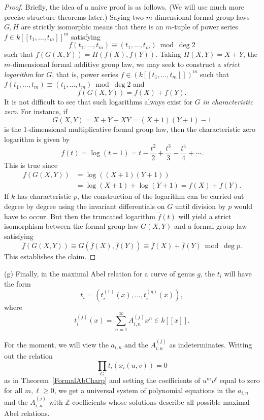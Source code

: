 \documentclass[12pt]{amsart}
\theoremstyle{theorem}
\newcommand{\ZZ}{\mathbb{Z}}
\begin{document}
\begin{proof}
Briefly, the idea of a naive proof is as follows. (We will use much more precise structure theorems
later.)   Saying two $m$-dimensional formal group laws $G, H$ are strictly isomorphic means that there is 
an $m$-tuple of power series $f\in k[[t_1,\ldots,t_m]]^m$ satisfying 
$$f(t_1,\ldots, t_m) \equiv (t_1, \ldots, t_m) \bmod \deg 2$$  
such that $f(G(X,Y)) = H(f(X), f(Y))$.    Taking $H(X,Y) = X + Y$, the $m$-dimensional formal
additive group law, we may seek to construct
a \emph{strict logarithm} for $G$, that is, power series 
$f \in (k[[t_1,\ldots, t_m]])^m$ such that $f(t_1, \ldots, t_m) \equiv (t_1,\ldots, t_m) \bmod \deg 2$ and 
$$f(G(X,Y)) = f(X) + f(Y).$$
It is not difficult to see that such logarithms always exist for $G$ \emph{in characteristic zero}.
For instance, if 
$$G(X,Y) = X + Y + XY = (X+1)(Y+1) - 1$$ 
is the 1-dimensional multiplicative formal group law,
then the characteristic zero logarithm is given by 
$$f(t) = \log(t+1) = t - \frac{t^2}{2} + \frac{t^3}{3} - \frac{t^4}{4} + \cdots .$$
This is true since
\begin{align*} f(G(X,Y)) &= \log((X+1)(Y+1))\\
&= \log(X+1) + \log(Y+1) = f(X) + f(Y).
\end{align*}
If $k$ has characteristic $p$, the construction of the logarithm can be carried out degree by degree
using the invariant differentials on $G$ until division by $p$ would have to
occur.  But then the truncated logarithm $\overline{f}(t)$ will yield a strict isomorphism between the
formal group law $G(X,Y)$ and a formal group law satisfying
$$\overline{f}(G(X,Y)) \equiv G(\overline{f}(X), \overline{f}(Y)) \equiv  \overline{f}(X) + \overline{f}(Y) \bmod \deg p.$$
This establishes the claim.
\end{proof}

\vskip 10pt
\noindent
(g)  Finally, in the maximal Abel relation for a curve of genus $g$, the $t_i$ will have the form
$$t_i = (t_i^{(1)} (x), \ldots, t_i^{(g)}(x)),$$
where 
$$t_i^{(j)}(x) = \sum_{n=1}^\infty A_{i,n}^{(j)} x^n \in k[[x]].$$

For the moment, we will view the $a_{i,n}$ and the $A_{i,n}^{(j)}$ as indeterminates.
Writing out the relation 
$$\prod_G t_i(x_i(u,v)) = 0$$
as in Theorem~\ref{FormalAbCharp}
and setting the coefficients of $u^m v^\ell$ equal to zero for all $m, \ell \ge 0$, we get 
a universal system of polynomial equations in the $a_{i,n}$ and the $A_{i,n}^{(j)}$ with $\ZZ$-coefficients
whose solutions describe all possible maximal Abel relations.  
\end{document}
